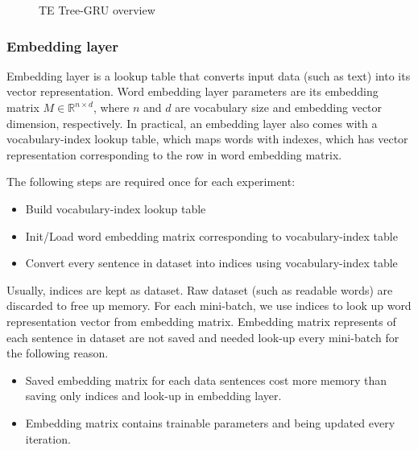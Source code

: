 \begin{figure}[H]
    \centering
    \caption[TE Tree-GRU overview]{TE Tree-GRU overview}
    \label{fig:vtgrusummary}
\end{figure}

\subsubsection{Embedding layer}\label{sec:embedding}
Embedding layer is a lookup table that converts input data (such as text) into its vector representation. Word embedding layer parameters are its embedding matrix $M  \in \mathbb{R}^{n \times d}$, where $n$ and $d$ are vocabulary size and embedding vector dimension, respectively. In practical, an embedding layer also comes with a vocabulary-index lookup table, which maps words with indexes, which has vector representation corresponding to the row in word embedding matrix.

The following steps are required once for each experiment:
\begin{itemize}
    \item Build vocabulary-index lookup table
    \item Init/Load word embedding matrix corresponding to vocabulary-index table
    \item Convert every sentence in dataset into indices using vocabulary-index table
\end{itemize}
Usually, indices are kept as dataset. Raw dataset (such as readable words) are discarded to free up memory. For each mini-batch, we use indices to look up word representation vector from embedding matrix. Embedding matrix represents of each sentence in dataset are not saved and needed look-up every mini-batch for the following reason.
\begin{itemize}
    \item Saved embedding matrix for each data sentences cost more memory than saving only indices and look-up in embedding layer.
    \item Embedding matrix contains trainable parameters and being updated every iteration.
\end{itemize}

